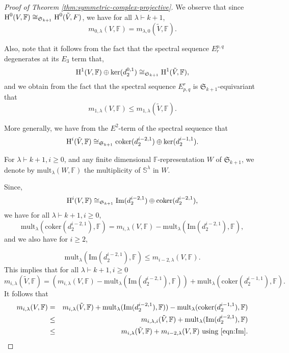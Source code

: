 \documentclass{amsart}
\theoremstyle{definition}
\theoremstyle{remark}
\numberwithin{equation}{section}
\begin{document}
\begin{proof}[Proof of Theorem \ref{thm:symmetric-complex-projective}]
We observe that since ${\mbox{\rm H}}^0(V,{\mathbb{F}}) \cong_{\mathfrak{S}_{k+1}} {\mbox{\rm H}}^0(\tilde{V},F)$, 
we have for all $\lambda \vdash k+1$,
\begin{equation}
\label{eqn:spectral-multiplicity-0}
m_{0,\lambda}(V,{\mathbb{F}}) = {m}_{\lambda,0}(\tilde{V},{\mathbb{F}}).
\end{equation}

Also, note that it follows from the fact that the spectral sequence $E_r^{p,q}$  degenerates at its
$E_3$ term that, 
\[
{\mbox{\rm H}}^1(V,{\mathbb{F}}) \oplus {\mbox{\rm ker}}(d_2^{0,1}) \cong_{\mathfrak{S}_{k+1}}  {\mbox{\rm H}}^1(\tilde{V},{\mathbb{F}}),
\]
and we obtain from the fact that the spectral sequence $E^r_{p,q}$ is $\mathfrak{S}_{k+1}$-equivariant that
\begin{equation}
\label{eqn:spectral-multiplicity-1}
m_{1,\lambda}(V,{\mathbb{F}}) \leq {m}_{1,\lambda}(\tilde{V},{\mathbb{F}}).
\end{equation}

More generally, we have from the $E^2$-term of the spectral sequence that
\[
{\mbox{\rm H}}^i(\tilde{V},{\mathbb{F}})  \cong_{\mathfrak{S}_{k+1}}  \mathrm{coker}(d_2^{i-2,1}) \oplus {\mbox{\rm ker}}(d_2^{i-1,1}).
\]

For $\lambda \vdash k+1, i\geq 0$, 
and any finite dimensional ${\mathbb{F}}$-representation $W$ of $\mathfrak{S}_{k+1}$, we denote 
by ${\mathrm{mult}}_{\lambda}(W,{\mathbb{F}})$ the multiplicity of $\mathbb{S}^\lambda$ in $W$.

Since, 
\[
{\mbox{\rm H}}^i(V,{\mathbb{F}}) \cong_{\mathfrak{S}_{k+1}}  \mathrm{Im}(d_2^{i-2,1}) \oplus \mathrm{coker}(d_2^{i-2,1}),
\]
we have for all $\lambda \vdash k+1, i \geq 0$,
\[
{\mathrm{mult}}_{\lambda}( \mathrm{coker}(d_2^{i-2,1}),{\mathbb{F}}) = m_{i,\lambda}(V,{\mathbb{F}})  -  {\mathrm{mult}}_{\lambda}(\mathrm{Im}(d_2^{i-2,1}),{\mathbb{F}}),
\]
and we also have for $i \geq 2$,

\begin{equation}
\label{eqn:Im}
{\mathrm{mult}}_\lambda(\mathrm{Im}(d_2^{i-2,1}),{\mathbb{F}}) \leq m_{i-2,\lambda}(V,{\mathbb{F}}).
\end{equation}
This implies that for all $\lambda \vdash k+1, i \geq 0$
\[
m_{i,\lambda}(\tilde{V},{\mathbb{F}}) =  (m_{i,\lambda}(V,{\mathbb{F}}) - {\mathrm{mult}}_{\lambda}(\mathrm{Im}(d_2^{i-2,1}),{\mathbb{F}})) + 
{\mathrm{mult}}_\lambda(\mathrm{coker}(d_2^{i-1,1}),{\mathbb{F}}).
\]
It follows that
\begin{eqnarray*}
m_{i,\lambda}(V,{\mathbb{F}}) &=& 
m_{i,\lambda}(\tilde{V},{\mathbb{F}}) + {\mathrm{mult}}_{\lambda}(\mathrm{Im}(d_2^{i-2,1}),{\mathbb{F}})) - 
{\mathrm{mult}}_\lambda(\mathrm{coker}(d_2^{i-1,1}),{\mathbb{F}}) \\
                     &\leq& m_{i,\lambda,i}(\tilde{V},{\mathbb{F}}) + {\mathrm{mult}}_\lambda(\mathrm{Im}(d_2^{i-2,1}),{\mathbb{F}}) \\
                     &\leq& m_{i,\lambda}(\tilde{V},{\mathbb{F}}) + m_{i-2,\lambda}(V,{\mathbb{F}}) \mbox{ using \eqref{eqn:Im}}.
                     \end{eqnarray*}


\end{proof}
\end{document}
